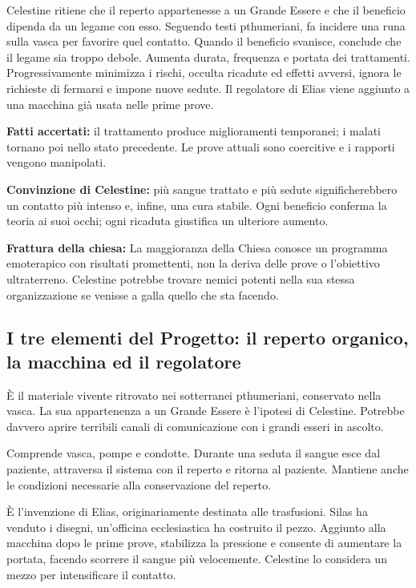 \documentclass[11pt,a4paper]{article}
\begin{document}
Celestine ritiene che il reperto appartenesse a un Grande Essere e che il beneficio dipenda da un legame con esso. Seguendo testi pthumeriani, fa incidere una runa sulla vasca per favorire quel contatto. Quando il beneficio svanisce, conclude che il legame sia troppo debole. Aumenta durata, frequenza e portata dei trattamenti. Progressivamente minimizza i rischi, occulta ricadute ed effetti avversi, ignora le richieste di fermarsi e impone nuove sedute. Il regolatore di Elias viene aggiunto a una macchina già usata nelle prime prove.

\textbf{Fatti accertati:} il trattamento produce miglioramenti temporanei; i malati tornano poi nello stato precedente. Le prove attuali sono coercitive e i rapporti vengono manipolati.\par
\textbf{Convinzione di Celestine:} più sangue trattato e più sedute significherebbero un contatto più intenso e, infine, una cura stabile. Ogni beneficio conferma la teoria ai suoi occhi; ogni ricaduta giustifica un ulteriore aumento.\par
\textbf{Frattura della chiesa:} La maggioranza della Chiesa conosce un programma emoterapico con risultati promettenti, non la deriva delle prove o l'obiettivo ultraterreno. Celestine potrebbe trovare nemici potenti nella sua stessa organizzazione se venisse a galla quello che sta facendo.



\subsection{I tre elementi del Progetto: il reperto organico, la macchina ed il regolatore}
\begin{description}[leftmargin=5mm,style=nextline]
\item[Reperto organico.]
È il materiale vivente ritrovato nei sotterranei pthumeriani, conservato nella vasca. La sua appartenenza a un Grande Essere è l'ipotesi di Celestine. Potrebbe davvero aprire terribili canali di comunicazione con i grandi esseri in ascolto.
\item[Macchina.]
Comprende vasca, pompe e condotte. Durante una seduta il sangue esce dal paziente, attraversa il sistema con il reperto e ritorna al paziente. Mantiene anche le condizioni necessarie alla conservazione del reperto.
\item[Regolatore.]
È l'invenzione di Elias, originariamente destinata alle trasfusioni. Silas ha venduto i disegni, un'officina ecclesiastica ha costruito il pezzo. Aggiunto alla macchina dopo le prime prove, stabilizza la pressione e consente di aumentare la portata, facendo scorrere il sangue più velocemente. Celestine lo considera un mezzo per intensificare il contatto.
\end{description}
\end{document}
